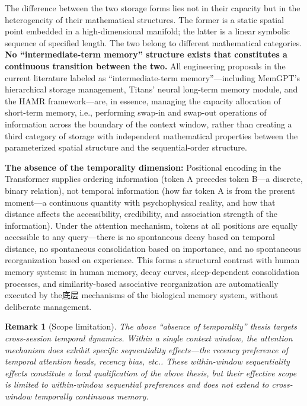 \documentclass[11pt,a4paper]{article}
\newtheorem{remark}[theorem]{Remark}
\theoremstyle{definition}
\begin{document}
The difference between the two storage forms lies not in their capacity but in the heterogeneity of their mathematical structures. The former is a static spatial point embedded in a high-dimensional manifold; the latter is a linear symbolic sequence of specified length. The two belong to different mathematical categories. \textbf{No ``intermediate-term memory'' structure exists that constitutes a continuous transition between the two.} All engineering proposals in the current literature labeled as ``intermediate-term memory''---including MemGPT's hierarchical storage management\cite{memgpt_2023}, Titans' neural long-term memory module\cite{titans_2024}, and the HAMR framework\cite{hamr2024}---are, in essence, managing the capacity allocation of short-term memory, i.e., performing swap-in and swap-out operations of information across the boundary of the context window, rather than creating a third category of storage with independent mathematical properties between the parameterized spatial structure and the sequential-order structure.

\textbf{The absence of the temporality dimension:} Positional encoding in the Transformer supplies ordering information (token A precedes token B---a discrete, binary relation), not temporal information (how far token A is from the present moment---a continuous quantity with psychophysical reality, and how that distance affects the accessibility, credibility, and association strength of the information). Under the attention mechanism, tokens at all positions are equally accessible to any query---there is no spontaneous decay based on temporal distance, no spontaneous consolidation based on importance, and no spontaneous reorganization based on experience. This forms a structural contrast with human memory systems: in human memory, decay curves, sleep-dependent consolidation processes, and similarity-based associative reorganization are automatically executed by the底层 mechanisms of the biological memory system, without deliberate management.

\begin{remark}[Scope limitation]
The above ``absence of temporality'' thesis targets cross-session temporal dynamics. Within a single context window, the attention mechanism does exhibit specific sequentiality effects---the recency preference of temporal attention heads, recency bias, etc.\cite{liu2023lost}. These within-window sequentiality effects constitute a local qualification of the above thesis, but their effective scope is limited to within-window sequential preferences and does not extend to cross-window temporally continuous memory.
\end{remark}
\end{document}
